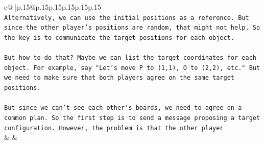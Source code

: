\documentclass{article}
\begin{document}
{\begin{supertabular}{c@{$\;$}|p{.15\linewidth}@{}p{.15\linewidth}p{.15\linewidth}p{.15\linewidth}p{.15\linewidth}p{.15\linewidth}}
{{{\\ 
\texttt{Alternatively, we can use the initial positions as a reference. But since the other player's positions are random, that might not help. So the key is to communicate the target positions for each object.} \\
\\ 
\texttt{But how to do that? Maybe we can list the target coordinates for each object. For example, say "Let's move P to (1,1), O to (2,2), etc." But we need to make sure that both players agree on the same target positions.} \\
\\ 
\texttt{But since we can't see each other's boards, we need to agree on a common plan. So the first step is to send a message proposing a target configuration. However, the problem is that the other player} \\
            }
        }
    }
    & & \\ \\


\end{supertabular}}
\end{document}
